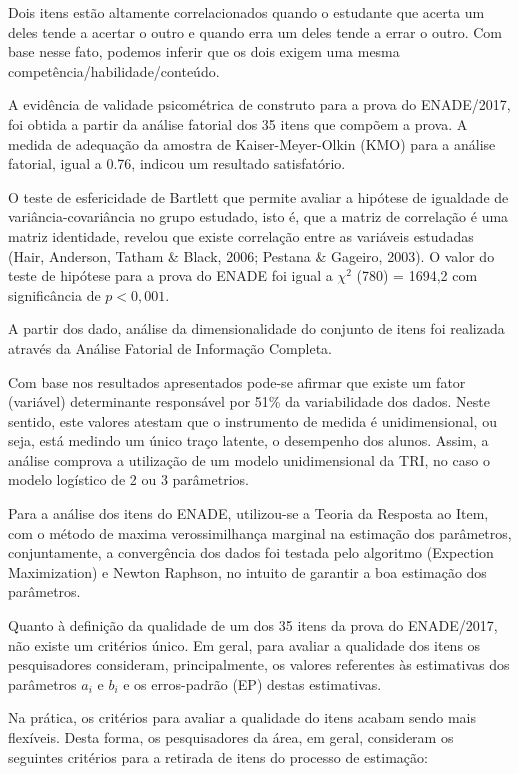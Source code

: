 \documentclass[12pt]{article}
\begin{document}
Dois itens estão altamente correlacionados quando o estudante que acerta um deles tende a acertar o outro e quando erra um deles tende a errar o outro. Com base nesse fato, podemos inferir que os dois exigem uma mesma competência/habilidade/conteúdo. 

A evidência de validade psicométrica de construto para a prova do ENADE/2017, foi obtida a partir da análise fatorial dos 35 itens que compõem a prova. A medida de adequação da amostra de Kaiser-Meyer-Olkin (KMO) para a análise fatorial, igual a 0.76, indicou um resultado satisfatório.


O teste de esfericidade de Bartlett que permite avaliar a hipótese de igualdade de variância-covariância no grupo estudado, isto é, que a matriz de correlação é uma matriz identidade, revelou que existe correlação entre as variáveis estudadas (Hair, Anderson, Tatham \& Black, 2006; Pestana \& Gageiro, 2003). O valor do teste de hipótese para a prova do ENADE foi igual a $\chi^2$ (780) = 1694,2 com significância de $p < 0,001$. 

A partir dos dado, análise da dimensionalidade do conjunto de itens foi realizada através da Análise Fatorial de Informação Completa. 

Com base nos resultados apresentados pode-se afirmar que existe um fator (variável) determinante responsável por 51\% da variabilidade dos dados. Neste sentido, este valores atestam que o instrumento de medida é unidimensional, ou seja, está medindo um único traço latente, o desempenho dos alunos. Assim, a análise comprova a utilização de um modelo unidimensional da TRI, no caso o modelo logístico de 2 ou 3 parâmetrios.

\newpage
Para a análise dos itens do ENADE, utilizou-se a Teoria da Resposta ao Item, com o método de maxima verossimilhança marginal na estimação dos parâmetros, conjuntamente, a convergência dos dados foi testada pelo algoritmo (Expection Maximization) e Newton Raphson, no intuito de garantir a boa estimação dos parâmetros.



Quanto à definição da qualidade de um dos 35 itens da prova do ENADE/2017, não existe um critérios único. Em geral, para avaliar a qualidade dos itens os pesquisadores consideram, principalmente, os valores referentes às estimativas dos parâmetros $a_{i}$ e $b_{i}$ e os erros-padrão (EP) destas estimativas.

Na prática, os critérios para avaliar a qualidade do itens acabam sendo mais flexíveis. Desta forma, os pesquisadores da área, em geral, consideram os seguintes critérios para a retirada de itens do processo de estimação:
\end{document}

